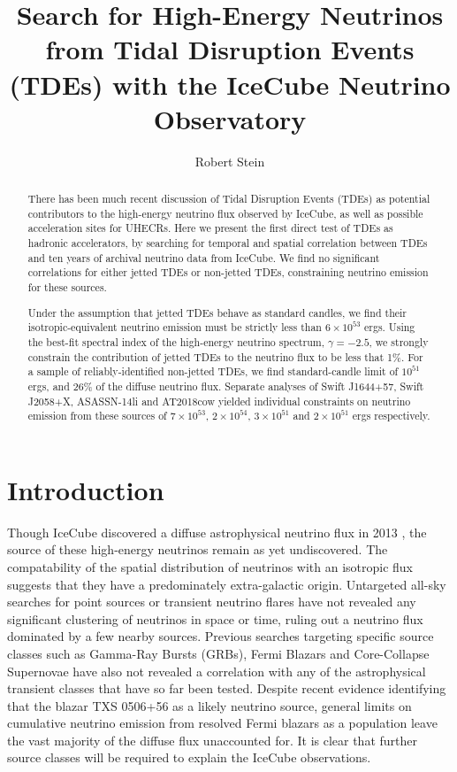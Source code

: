\documentclass[twocolumn, tighten, linenumbers]{aastex62}
\begin{document}
\title{Search for High-Energy Neutrinos from Tidal Disruption Events (TDEs) with the IceCube Neutrino Observatory}

\author{Robert Stein}

\begin{abstract}
There has been much recent discussion of Tidal Disruption Events (TDEs) as potential contributors to the high-energy neutrino flux observed by IceCube, as well as possible acceleration sites for UHECRs. Here we present the first direct test of TDEs as hadronic accelerators, by searching for temporal and spatial correlation between TDEs and ten years of archival neutrino data from IceCube. We find no significant correlations for either jetted TDEs or non-jetted TDEs, constraining neutrino emission for these sources. 

Under the assumption that jetted TDEs behave as standard candles, we find their isotropic-equivalent neutrino emission must be strictly less than $6 \times 10^{53} $ ergs.  Using the best-fit spectral index of the high-energy neutrino spectrum, $\gamma=-2.5$, we strongly constrain the contribution of jetted TDEs to the neutrino flux to be less that 1\%.  For a sample of reliably-identified non-jetted TDEs, we find standard-candle limit of $10^{51} $ ergs, and 26\% of the diffuse neutrino flux. Separate analyses of Swift J1644+57, Swift J2058+X, ASASSN-14li and AT2018cow yielded individual constraints on neutrino emission from these sources of $7 \times 10^{53} $, $2 \times 10^{54} $,  $3 \times 10^{51} $ and $2 \times 10^{51} $ ergs respectively.
\end{abstract}


\section{Introduction} 
\label{sec:introduction}

Though IceCube discovered a diffuse astrophysical neutrino flux in 2013 \citep{Aartsen:2015knd, Aartsen:2013jdh}, the source of these high-energy neutrinos remain as yet undiscovered. The compatability of the spatial distribution of neutrinos with an isotropic flux suggests that they have a predominately extra-galactic origin. Untargeted all-sky searches for point sources or transient neutrino flares have not revealed any significant clustering of neutrinos in space or time, ruling out a neutrino flux dominated by a few nearby sources. Previous searches targeting specific source classes such as Gamma-Ray Bursts (GRBs), Fermi Blazars and Core-Collapse Supernovae have also not revealed a correlation with any of the astrophysical transient classes that have so far been tested. Despite recent evidence identifying that the blazar TXS 0506+56 as a likely neutrino source, general limits on cumulative neutrino emission from resolved Fermi blazars as a population leave the vast majority of the diffuse flux unaccounted for. It is clear that further source classes will be required to explain the IceCube observations.
\end{document}

